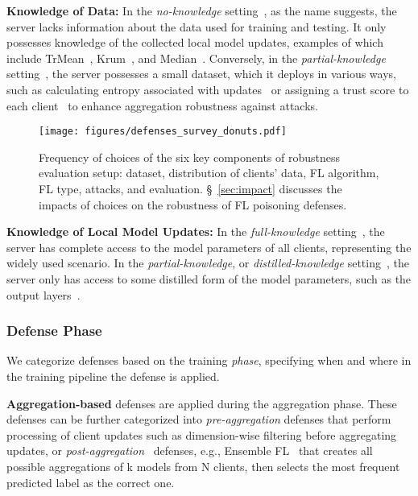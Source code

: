 \noindent\textbf{Knowledge of Data:} 
In the \emph{no-knowledge} setting~\cite{yin2018byzantine, cao2022fedrecover, zhang2022fldetector, chang2019cronus}, as the name suggests, the server lacks information about the data used for training and testing. It only possesses knowledge of the collected local model updates, examples of which include TrMean~\cite{yin2018byzantine}, Krum~\cite{blanchard2017machine}, and Median~\cite{yin2018byzantine}. Conversely, in the \emph{partial-knowledge} setting~\cite{park2021sageflow, xie2022robust, cao2020fltrust}, the server possesses a small dataset, which it deploys in various ways, such as calculating entropy associated with updates~\cite{park2021sageflow} or assigning a trust score to each client~\cite{cao2020fltrust} to enhance aggregation robustness against attacks.
\begin{figure*}[t]
\centering
\texttt{[image: figures/defenses\_survey\_donuts.pdf]}
\caption{Frequency of choices of the six key components of robustness evaluation setup: dataset, distribution of clients' data, FL algorithm, FL type, attacks, and evaluation. \S~\ref{sec:impact} discusses the impacts of choices on the robustness of FL poisoning defenses.}
\label{fig:defense_survey}
\end{figure*}

\noindent\textbf{Knowledge of Local Model Updates:} 
In the \emph{full-knowledge} setting~\cite{cao2022flcert, blanchard2017machine, li2020learning}, the server has complete access to the model parameters of all clients, representing the widely used scenario. In the \emph{partial-knowledge}, or \emph{distilled-knowledge} setting~\cite{shen2016auror, chang2019cronus}, the server only has access to some distilled form of the model parameters, such as the output layers~\cite{chang2019cronus}.
\subsubsection{Defense Phase}\label{systemization:classification:phase}
We categorize defenses based on the training \emph{phase}, specifying when and where in the training pipeline the defense is applied.

\noindent\textbf{Aggregation-based} defenses are applied during the aggregation phase. These defenses can be further categorized into \emph{pre-aggregation} \cite{ranjan2022securing, mhamdi2018the, yin2018byzantine, blanchard2017machine, park2021sageflow} defenses that perform processing of client updates such as dimension-wise filtering before aggregating updates, or \emph{post-aggregation}~\cite{cao2022flcert, fang2020local, cao2021provably} defenses, e.g., Ensemble FL~\cite{cao2021provably} that creates all possible aggregations of k models from N clients, then selects the most frequent predicted label as the correct one.

